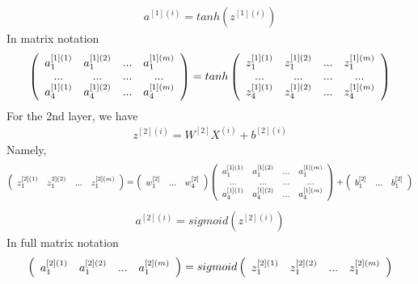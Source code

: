 \documentclass[a4paper]{article}
\begin{document}
\begin{align*}
	a^{[1](i)} = tanh(z^{[1](i)})
\end{align*}
In matrix notation
\begin{align*}
\left( \begin{array} {c c c c}
a_1^{[1](1)} & a_1^{[1](2)} & ... & a_1^{[1](m)} \\
... & ... & ... & ... \\
a_4^{[1](1)} & a_4^{[1](2)} & ... & a_4^{[1](m)} \\
\end{array} \right)
=tanh \left( \begin{array} {c c c c}
z_1^{[1](1)} & z_1^{[1](2)} & ... & z_1^{[1](m)} \\
... & ... & ... & ... \\
z_4^{[1](1)} & z_4^{[1](2)} & ... & z_4^{[1](m)} \\
\end{array} \right)
\end{align*}
For the 2nd layer, we have 
\begin{align*}
	z^{[2](i)} = W^{[2]} X^{(i)} + b^{[2](i)}
\end{align*}
Namely,
\begin{align*}
\left( \begin{array} {c c c c}
z_1^{[2](1)} & z_1^{2](2)} & ... & z_1^{[2](m)} \\
\end{array} \right)
=\left( \begin{array} {c c c}
w_{1}^{[2]} & ... &   w_{4}^{[2]}\\
\end{array} \right)
\left( \begin{array} {c c c c}
a_1^{[1](1)} & a_1^{[1](2)} & ... & a_1^{[1](m)} \\
...&...&...&...\\
a_4^{[1](1)} & a_4^{[1](2)} & ... & a_4^{[1](m)} \\
\end{array} \right) 
+
\left( \begin{array} {c c c }
b_1^{[2]} & ... &  b_1^{[2]} \\
\end{array} \right)
\end{align*}
\begin{align*}
	a^{[2](i)} = sigmoid(z^{[2](i)})
\end{align*}
In full matrix notation
\begin{align*}
\left( \begin{array} {c c c c}
a_1^{[2](1)} & a_1^{[2](2)} & ... & a_1^{[2](m)} \\
\end{array} \right)
=sigmoid \left( \begin{array} {c c c c}
z_1^{[2](1)} & z_1^{[2](2)} & ... & z_1^{[2](m)} \\
\end{array} \right)
\end{align*}
\end{document}
